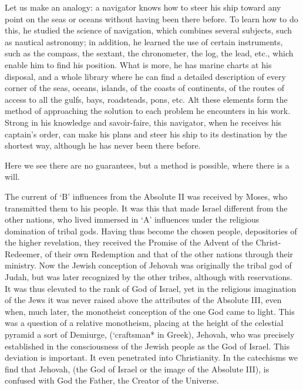 \begin{quotex}
Let us make an analogy: a navigator knows how to steer his ship toward any point on the seas or oceans without having been there before. To learn how to do this, he studied the science of navigation, which combines several subjects, such as nautical astronomy; in addition, he learned the use of certain instruments, such as the compass, the sextant, the chronometer, the log, the lead, etc., which enable him to find his position. What is more, he has marine charts at his disposal, and a whole library where he can find a detailed description of every corner of the seas, oceans, islands, of the coasts of continents, of the routes of access to all the gulfs, bays, roadsteads, pons, etc. Alt these elements form the method of approaching the solution to each problem he encounters in his work. Strong in his knowledge and savoir-faire, this navigator, when he receives his captain's order, can make his plans and steer his ship to its destination by the shortest way, although he has never been there before.
\end{quotex}


Here we see there are no guarantees, but a method is possible, where there is a will.

\begin{quotex}
The current of `B' influences from the Absolute II was received by Moses, who transmitted them to his people. It was this that made Israel different from the other nations, who lived immersed in `A' influences under the religious domination of tribal gods. Having thus become the chosen people, depositories of the higher revelation, they received the Promise of the Advent of the Christ-Redeemer, of their own Redemption and that of the other nations through their ministry. Now the Jewish conception of Jehovah was originally the tribal god of Judah, but was later recognized by the other tribes, although with reservations. It was thus elevated to the rank of God of Israel, yet in the religious imagination of the Jews it was never raised above the attributes of the Absolute III, even when, much later, the monotheist conception of the one God came to light. This was a question of a relative monotheism, placing at the height of the celestial pyramid a sort of Demiurge, (`craftsman* in Greek), Jehovah, who was precisely established in the consciousness of the Jewish people as the God of Israel. This deviation is important. It even penetrated into Christianity. In the catechisms we find that Jehovah, (the God of Israel or the image of the Absolute III), is confused with God the Father, the Creator of the Universe.
\end{quotex}


